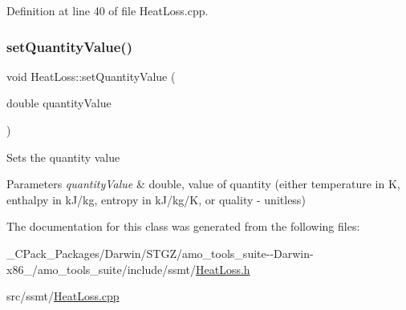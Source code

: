 Definition at line 40 of file Heat\+Loss.\+cpp.

\mbox{\label{class_heat_loss_ae6b6c4ac28471d7bc94e3886c48a90bd}} 
\subsubsection{\texorpdfstring{set\+Quantity\+Value()}{setQuantityValue()}\hspace{0.1cm}{\footnotesize\ttfamily [3/3]}}
{\footnotesize\ttfamily void Heat\+Loss\+::set\+Quantity\+Value (\begin{DoxyParamCaption}\item[{double}]{quantity\+Value }\end{DoxyParamCaption})}

Sets the quantity value 
\begin{DoxyParams}{Parameters}
{\em quantity\+Value} & double, value of quantity (either temperature in K, enthalpy in k\+J/kg, entropy in k\+J/kg/K, or quality -\/ unitless) \\
\hline
\end{DoxyParams}


The documentation for this class was generated from the following files\+:\begin{DoxyCompactItemize}
\item 
\+\_\+\+C\+Pack\+\_\+\+Packages/\+Darwin/\+S\+T\+G\+Z/amo\+\_\+tools\+\_\+suite-\/-\/\+Darwin-\/x86\+\_/amo\+\_\+tools\+\_\+suite/include/ssmt/\hyperlink{___c_pack___packages_2_darwin_2_s_t_g_z_2amo__tools__suite--_darwin-x86__64_2amo__tools__suite_2include_2ssmt_2_heat_loss_8h}{Heat\+Loss.\+h}\item 
src/ssmt/\hyperlink{_heat_loss_8cpp}{Heat\+Loss.\+cpp}\end{DoxyCompactItemize}
